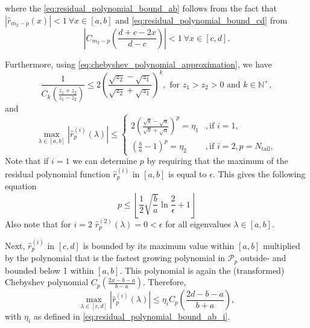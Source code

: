 where the \cref{eq:residual_polynomial_bound_ab} follows from the fact that $|\hat{r}_{m_2-p}(x)| < 1 \ \forall x \in [a,b]$ and \cref{eq:residual_polynomial_bound_cd} from
\[
    \left|C_{m_2-p}\left(\frac{d+c -2x}{d-c}\right)\right| < 1 \ \forall x \in [c,d].
\]

Furthermore, using \cref{eq:chebyshev_polynomial_approximation}, we have
\begin{equation}
    \frac{1}{C_{k}\left(\frac{z_1 + z_2}{z_1 - z_2}\right)} \leq 2 \left(\frac{\sqrt{z_2} - \sqrt{z_1}}{\sqrt{z_2} + \sqrt{z_1}}\right)^k, \text{ for } z_1 > z_2 > 0 \text{ and } k \in \mathbb{N}^+,
    \label{eq:chebyshev_polynomial_bound}
\end{equation}
and
\begin{equation}
    \max_{\lambda \in [a,b]} |\hat{r}^{(i)}_p(\lambda)| \leq
    \begin{cases}
        2\left(\frac{\sqrt{b}-\sqrt{a}}{\sqrt{b}+\sqrt{a}}\right)^p=\eta_1 & , \text{if } i = 1,                      \\
        \left(\frac{b}{a}-1\right)^p=\eta_2                                & , \text{if } i = 2, p = N_{\text{tail}},
    \end{cases}
    \label{eq:residual_polynomial_bound_ab_i}
\end{equation}
Note that if $i=1$ we can determine $p$ by requiring that the maximum of the residual polynomial function $\hat{r}^{(i)}_p$ in $[a,b]$ is equal to $\epsilon$. This gives the following equation
\begin{equation}
    p \leq \left\lfloor\frac{1}{2}\sqrt{\frac{b}{a}}\ln{\frac{2}{\epsilon}} + 1\right\rfloor
    \label{eq:chebyshev_degree_p}
\end{equation}
Also note that for $i=2$ $\hat{r}^{(2)}_p(\lambda) = 0 < \epsilon$ for all eigenvalues $\lambda \in [a,b]$.

Next, $\hat{r}^{(i)}_p$ in $[c,d]$ is bounded by its maximum value within $[a,b]$ multiplied by the polynomial that is the fastest growing polynomial in $\mathcal{P}_{p}$ outside- and bounded below 1 within $[a,b]$. This polynomial is again the (transformed) Chebyshev polynomial $C_{p}\left(\frac{2x - b - a}{b - a}\right)$. Therefore,
\begin{equation*}
    \max_{\lambda \in [c,d]} |\hat{r}^{(i)}_p(\lambda)| \leq \eta_i C_{p}\left(\frac{2d - b - a}{b + a}\right),
\end{equation*}
with $\eta_i$ as defined in \cref{eq:residual_polynomial_bound_ab_i}.

